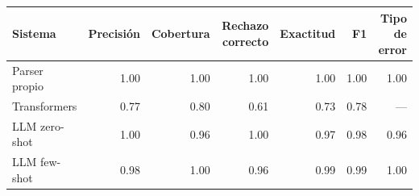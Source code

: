 \begin{tabular}{lrrrrrr}
\toprule
Sistema & Precisión & Cobertura & Rechazo correcto & Exactitud & F1 & Tipo de error \\
\midrule
Parser propio & 1.00 & 1.00 & 1.00 & 1.00 & 1.00 & 1.00 \\
Transformers & 0.77 & 0.80 & 0.61 & 0.73 & 0.78 & --- \\
LLM zero-shot & 1.00 & 0.96 & 1.00 & 0.97 & 0.98 & 0.96 \\
LLM few-shot & 0.98 & 1.00 & 0.96 & 0.99 & 0.99 & 1.00 \\
\bottomrule
\end{tabular}
